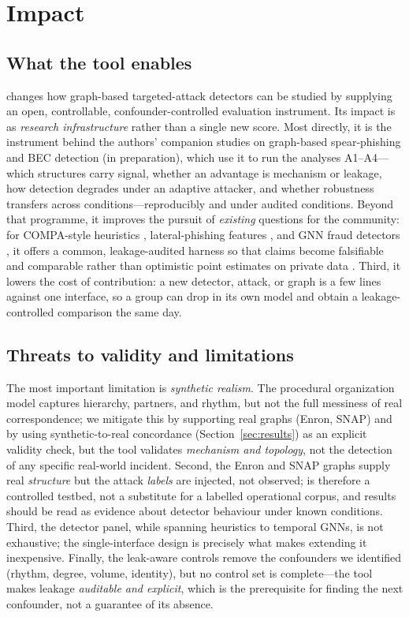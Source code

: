 \section{Impact}
\label{sec:discussion}

\subsection{What the tool enables}
\tool changes how graph-based targeted-attack detectors can be studied by supplying an open,
controllable, confounder-controlled evaluation instrument. Its impact is as \emph{research
infrastructure} rather than a single new score. Most directly, it is the instrument behind the
authors' companion studies on graph-based spear-phishing and BEC detection (in preparation),
which use it to run the analyses A1--A4---which structures carry signal, whether an advantage
is mechanism or leakage, how detection degrades under an adaptive attacker, and whether
robustness transfers across conditions---reproducibly and under audited conditions. Beyond that
programme, it improves the pursuit of \emph{existing} questions for the community: for
COMPA-style heuristics \cite{egele2013compa}, lateral-phishing features
\cite{ho2019detecting}, and GNN fraud detectors \cite{dou2020enhancing}, it offers a common,
leakage-audited harness so that claims become falsifiable and comparable rather than
optimistic point estimates on private data \cite{arp2022dos}. Third, it lowers the cost of
contribution: a new detector, attack, or graph is a few lines against one interface, so a
group can drop in its own model and obtain a leakage-controlled comparison the same day.

\subsection{Threats to validity and limitations}
The most important limitation is \emph{synthetic realism}. The procedural organization model
captures hierarchy, partners, and rhythm, but not the full messiness of real correspondence;
we mitigate this by supporting real graphs (Enron, SNAP) and by using synthetic-to-real
concordance (Section~\ref{sec:results}) as an explicit validity check, but the tool validates
\emph{mechanism and topology}, not the detection of any specific real-world incident.
Second, the Enron and SNAP graphs supply real \emph{structure} but the attack \emph{labels}
are injected, not observed; \tool is therefore a controlled testbed, not a substitute for a
labelled operational corpus, and results should be read as evidence about detector behaviour
under known conditions. Third, the detector panel, while spanning heuristics to temporal
GNNs, is not exhaustive; the single-interface design is precisely what makes extending it
inexpensive. Finally, the leak-aware controls remove the confounders we identified (rhythm,
degree, volume, identity), but no control set is complete---the tool makes leakage
\emph{auditable and explicit}, which is the prerequisite for finding the next confounder,
not a guarantee of its absence.

